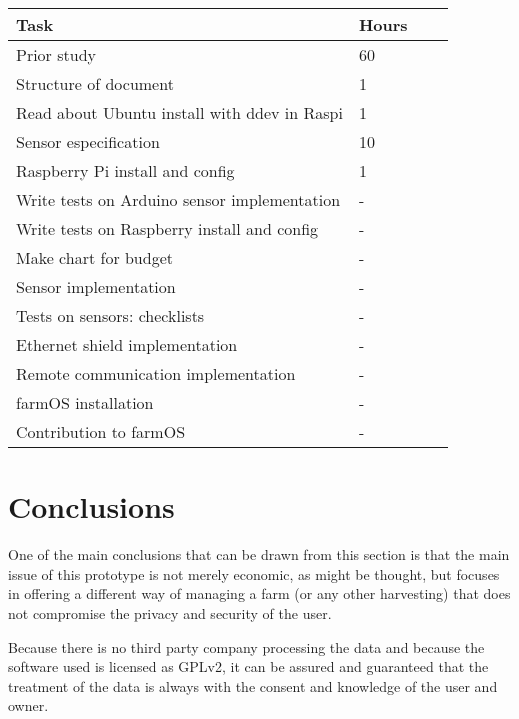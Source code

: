 \begin{table}[]
\begin{tabular}{llll}
\hline
        \rowcolor{lightpurple}
                               \textbf{Task}   & \textbf{Hours} \\ \hline
\rowcolor{lightgray}                                           
Prior study                                     & 60           \\
Structure of document                           & 1 \\
\rowcolor{lightgray}                                           
Read about Ubuntu install with ddev in Raspi    & 1           \\
Sensor especification                           & 10           \\
\rowcolor{lightgray}                                           
Raspberry Pi install and config                 & 1           \\
Write tests on Arduino sensor implementation    & - \\
\rowcolor{lightgray}                                           
Write tests on Raspberry install and config     & - \\  
Make chart for budget                           & - \\
\rowcolor{lightgray}                                           
Sensor implementation                           & - \\
Tests on sensors: checklists                    & - \\
\rowcolor{lightgray}                                           
Ethernet shield implementation                  & - \\
Remote communication implementation             & - \\
\rowcolor{lightgray}                                           
farmOS installation                             & - \\
Contribution to farmOS                          & -
\end{tabular}
\end{table}

\section{Conclusions}
One of the main conclusions that can be drawn from this section is that the main issue of this prototype is not merely economic, as might be thought, but focuses in offering a different way of managing a farm (or any other harvesting) that does not compromise the privacy and security of the user.

Because there is no third party company processing the data and because the software used is licensed as GPLv2, it can be assured and guaranteed that the treatment of the data is always with the consent and knowledge of the user and owner.
